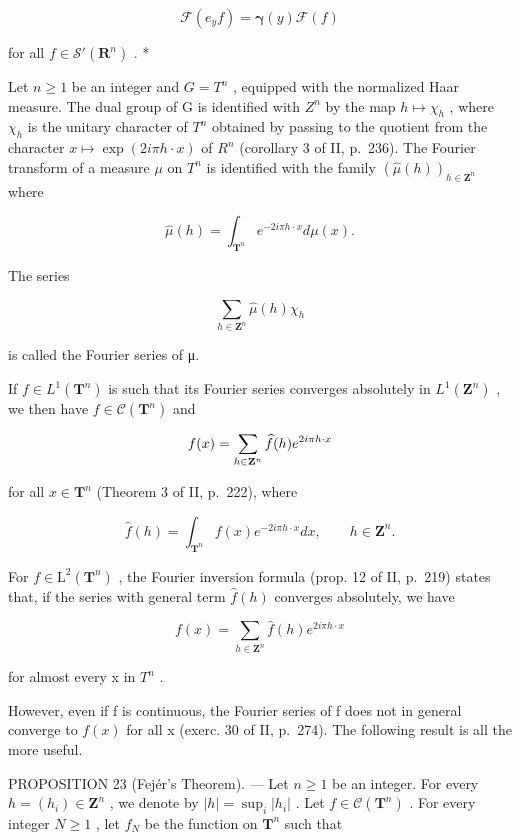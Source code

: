\[
\mathcal {F} (e _ {y} f) = \boldsymbol {\gamma} (y) \mathcal {F} (f)
\]

for all \(f \in \mathcal{S}'(\mathbf{R}^n)\) . *

Let \(n \geqslant 1\) be an integer and \(G = T^{n}\) , equipped with the normalized Haar measure. The dual group of G is identified with \(Z^{n}\) by the map \(h \mapsto \chi_{h}\) , where \(\chi_{h}\) is the unitary character of \(T^{n}\) obtained by passing to the quotient from the character \(x \mapsto \exp(2i\pi h \cdot x)\) of \(R^{n}\) (corollary 3 of II, p.~236). The Fourier transform of a measure \(\mu\) on \(T^{n}\) is identified with the family \((\widehat{\mu}(h))_{h \in \mathbf{Z}^{n}}\) where

\[
\widehat {\mu} (h) = \int_ {\mathbf {T} ^ {n}} e ^ {- 2 i \pi h \cdot x} d \mu (x).
\]

The series

\[
\sum_ {h \in \mathbf {Z} ^ {n}} \widehat {\mu} (h) \chi_ {h}
\]

is called the Fourier series of μ.

If \(f \in L^{1}(\mathbf{T}^{n})\) is such that its Fourier series converges absolutely in \(L^{1}(\mathbf{Z}^{n})\) , we then have \(f \in \mathcal{C}(\mathbf{T}^{n})\) and

\[
f (x) = \sum_ {h \in {\bf Z} ^ {n}} \widehat {f} (h) e ^ {2 i \pi h \cdot x}
\]

for all \(x \in \mathbf{T}^n\) (Theorem 3 of II, p.~222), where

\[
\widehat {f} (h) = \int_ {\mathbf {T} ^ {n}} f (x) e ^ {- 2 i \pi h \cdot x} d x, \qquad h \in \mathbf {Z} ^ {n}.
\]

For \(f \in \mathrm{L}^2(\mathbf{T}^n)\) , the Fourier inversion formula (prop. 12 of II, p.~219) states that, if the series with general term \(\widehat{f}(h)\) converges absolutely, we have

\[
f (x) = \sum_ {h \in \mathbf {Z} ^ {n}} \widehat {f} (h) e ^ {2 i \pi h \cdot x}
\]

for almost every x in \(T^{n}\) .

However, even if f is continuous, the Fourier series of f does not in general converge to \(f(x)\) for all x (exerc. 30 of II, p.~274). The following result is all the more useful.

PROPOSITION 23 (Fejér's Theorem). --- Let \(n \geqslant 1\) be an integer. For every \(h = (h_i) \in \mathbf{Z}^n\) , we denote by \(|h| = \sup_i |h_i|\) . Let \(f \in \mathcal{C}(\mathbf{T}^n)\) . For every integer \(N \geqslant 1\) , let \(f_N\) be the function on \(\mathbf{T}^n\) such that

